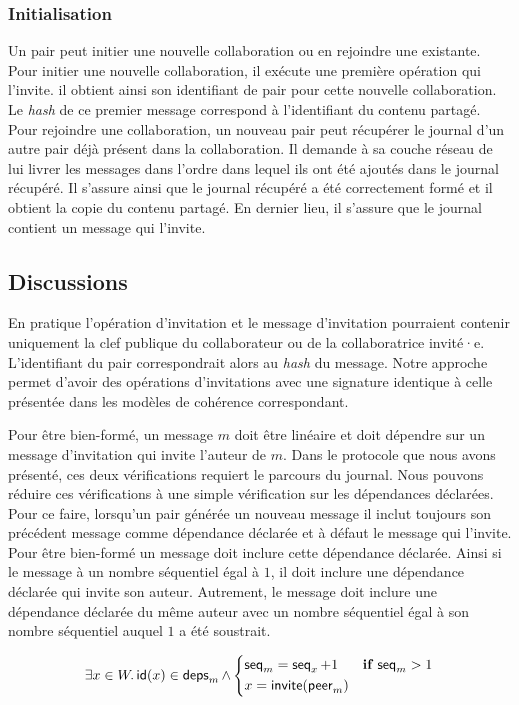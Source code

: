 \subsubsection{Initialisation}

Un pair peut initier une nouvelle collaboration ou en rejoindre une existante.
Pour initier une nouvelle collaboration, il exécute une première opération qui l'invite.
il obtient ainsi son identifiant de pair pour cette nouvelle collaboration.
Le \emph{hash} de ce premier message correspond à l'identifiant du contenu partagé.
Pour rejoindre une collaboration, un nouveau pair peut récupérer le journal d'un autre pair déjà présent dans la collaboration.
Il demande à sa couche réseau de lui livrer les messages dans l'ordre dans lequel ils ont été ajoutés dans le journal récupéré.
Il s'assure ainsi que le journal récupéré a été correctement formé et il obtient la copie du contenu partagé.
En dernier lieu, il s'assure que le journal contient un message qui l'invite.


\subsection{Discussions}

En pratique l'opération d'invitation et le message d'invitation pourraient contenir uniquement la clef publique du collaborateur ou de la collaboratrice invité·e.
L'identifiant du pair correspondrait alors au \emph{hash} du message.
Notre approche permet d'avoir des opérations d'invitations avec une signature identique à celle présentée dans les modèles de cohérence correspondant.

Pour être bien-formé, un message $m$ doit être linéaire et doit dépendre sur un message d'invitation qui invite l'auteur de $m$.
Dans le protocole que nous avons présenté, ces deux vérifications requiert le parcours du journal.
Nous pouvons réduire ces vérifications à une simple vérification sur les dépendances déclarées.
Pour ce faire, lorsqu'un pair générée un nouveau message il inclut toujours son précédent message comme dépendance déclarée et à défaut le message qui l'invite.
Pour être bien-formé un message doit inclure cette dépendance déclarée.
Ainsi si le message à un nombre séquentiel égal à $1$, il doit inclure une dépendance déclarée qui invite son auteur.
Autrement, le message doit inclure une dépendance déclarée du même auteur avec un nombre séquentiel égal à son nombre séquentiel auquel $1$ a été soustrait.

\begin{equation*}
    \exists x \in W \ldotp \operatorname{\mathsf{id}}(x) \in \operatorname{\mathsf{deps}}_m \land \begin{dcases}
    \operatorname{\mathsf{seq}}_m = \operatorname{\mathsf{seq}}_x + 1 & \mathrel{\mathbf{if}} \operatorname{\mathsf{seq}}_m > 1\\
    x = \operatorname{\mathsf{invite}}(\operatorname{\mathsf{peer}}_m)
    \end{dcases}
\end{equation*}


